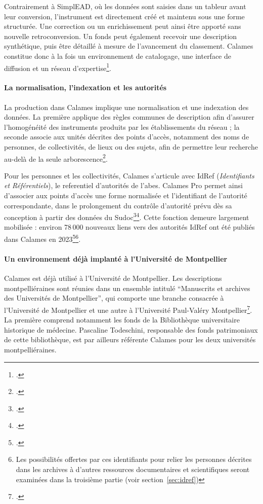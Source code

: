 Contrairement à SimplEAD, où les données sont saisies dans un tableur avant leur conversion, l'instrument est directement créé et maintenu sous une forme structurée. Une correction ou un enrichissement peut ainsi être apporté sans nouvelle \gls{retroconversion}. Un fonds peut également recevoir une description synthétique, puis être détaillé à mesure de l'avancement du classement. Calames constitue donc à la fois un environnement de catalogage, une interface de diffusion et un réseau d'expertise\footcite{LatourCalames2021}.

\paragraph{La normalisation, l'indexation et les autorités}

La production dans Calames implique une normalisation et une indexation des données. La première applique des règles communes de description afin d'assurer l'homogénéité des instruments produits par les établissements du réseau ; la seconde associe aux unités décrites des points d'accès, notamment des noms de personnes, de collectivités, de lieux ou des sujets, afin de permettre leur recherche au-delà de la seule arborescence\footcite{ABESCatalogageCalames}.

Pour les personnes et les collectivités, Calames s'articule avec IdRef (\textit{Identifiants et Référentiels}), le \gls{referentiel} d'autorités de l'\Gls{abes}. Calames Pro permet ainsi d'associer aux points d'accès une forme normalisée et l'identifiant de l'autorité correspondante, dans le prolongement du contrôle d'autorité prévu dès sa conception à partir des données du Sudoc\footcite{AbesIdRef}\footcite{Nicolas2008CalamesCatalogage}. Cette fonction demeure largement mobilisée : environ 78\,000 nouveaux liens vers des autorités IdRef ont été publiés dans Calames en 2023\footcite{ABESStatistiquesCalames2023}\footnote{Les possibilités offertes par ces identifiants pour relier les personnes décrites dans les archives à d'autres ressources documentaires et scientifiques seront examinées dans la troisième partie (voir section~\ref{sec:idref})}.

\paragraph{Un environnement déjà implanté à l'Université de Montpellier}

Calames est déjà utilisé à l'Université de Montpellier. Les descriptions montpelliéraines sont réunies dans un ensemble intitulé \enquote{Manuscrits et archives des Universités de Montpellier}, qui comporte une branche consacrée à l'Université de Montpellier et une autre à l'Université Paul-Valéry Montpellier\footcite{CalamesArchivesUniversitesMontpellier}. La première comprend notamment les fonds de la Bibliothèque universitaire historique de médecine. Pascaline Todeschini, responsable des fonds patrimoniaux de cette bibliothèque, est par ailleurs référente Calames pour les deux universités montpelliéraines.

